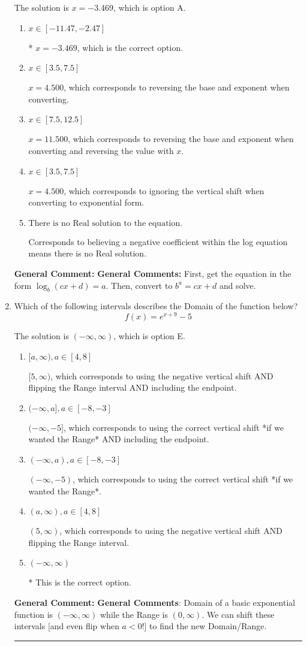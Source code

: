 \documentclass{extbook}[14pt]
\newcommand{\litem}[1]{\item #1

\rule{\textwidth}{0.4pt}}
\begin{document}
\begin{enumerate}
{The solution is \( x = -3.469 \), which is option A.\begin{enumerate}[label=\Alph*.]
\item \( x \in [-11.47, -2.47] \)

* $x = -3.469$, which is the correct option.
\item \( x \in [3.5, 7.5] \)

$x = 4.500$, which corresponds to reversing the base and exponent when converting.
\item \( x \in [7.5, 12.5] \)

$x = 11.500$, which corresponds to reversing the base and exponent when converting and reversing the value with $x$.
\item \( x \in [3.5, 7.5] \)

$x = 4.500$, which corresponds to ignoring the vertical shift when converting to exponential form.
\item \( \text{There is no Real solution to the equation.} \)

Corresponds to believing a negative coefficient within the log equation means there is no Real solution.
\end{enumerate}

\textbf{General Comment:} \textbf{General Comments:} First, get the equation in the form $\log_b{(cx+d)} = a$. Then, convert to $b^a = cx+d$ and solve.
}
\litem{
Which of the following intervals describes the Domain of the function below?
\[ f(x) = e^{x+9}-5 \]

The solution is \( (-\infty, \infty) \), which is option E.\begin{enumerate}[label=\Alph*.]
\item \( [a, \infty), a \in [4, 8] \)

$[5, \infty)$, which corresponds to using the negative vertical shift AND flipping the Range interval AND including the endpoint.
\item \( (-\infty, a], a \in [-8, -3] \)

$(-\infty, -5]$, which corresponds to using the correct vertical shift *if we wanted the Range* AND including the endpoint.
\item \( (-\infty, a), a \in [-8, -3] \)

$(-\infty, -5)$, which corresponds to using the correct vertical shift *if we wanted the Range*.
\item \( (a, \infty), a \in [4, 8] \)

$(5, \infty)$, which corresponds to using the negative vertical shift AND flipping the Range interval.
\item \( (-\infty, \infty) \)

* This is the correct option.
\end{enumerate}

\textbf{General Comment:} \textbf{General Comments}: Domain of a basic exponential function is $(-\infty, \infty)$ while the Range is $(0, \infty)$. We can shift these intervals [and even flip when $a<0$!] to find the new Domain/Range.
}
\end{enumerate}
\end{document}
